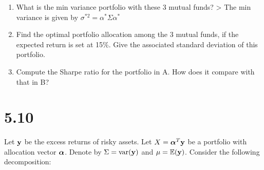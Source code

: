 \documentclass[11pt,]{article}
\newenvironment{Shaded}{\begin{snugshade}}{\end{snugshade}}
\newcommand{\CommentTok}[1]{\textcolor[rgb]{0.56,0.35,0.01}{\textit{#1}}}
\newcommand{\DataTypeTok}[1]{\textcolor[rgb]{0.13,0.29,0.53}{#1}}
\newcommand{\DecValTok}[1]{\textcolor[rgb]{0.00,0.00,0.81}{#1}}
\newcommand{\FloatTok}[1]{\textcolor[rgb]{0.00,0.00,0.81}{#1}}
\newcommand{\KeywordTok}[1]{\textcolor[rgb]{0.13,0.29,0.53}{\textbf{#1}}}
\newcommand{\NormalTok}[1]{#1}
\newcommand{\OperatorTok}[1]{\textcolor[rgb]{0.81,0.36,0.00}{\textbf{#1}}}
\newcommand{\StringTok}[1]{\textcolor[rgb]{0.31,0.60,0.02}{#1}}
\begin{document}
\begin{Shaded}
\end{Shaded}

\begin{enumerate}
\def\labelenumi{\arabic{enumi}.}
\item
  What is the min variance portfolio with these 3 mutual funds?
  \textgreater{} The min variance is given by
  \(\sigma^{*2} = \alpha^* \Sigma \alpha^*\)
\item
  Find the optimal portfolio allocation among the 3 mutual funds, if the
  expected return is set at 15\%. Give the associated standard deviation
  of this portfolio.
\item
  Compute the Sharpe ratio for the portfolio in A. How does it compare
  with that in B?
\end{enumerate}

\hypertarget{section-2}{%
\section{5.10}\label{section-2}}

Let \({\bm{\mathbf{\MakeLowercase{Y}}}}\) be the excess returns of risky
assets. Let
\(X = {\bm{\mathbf{\MakeLowercase{\alpha}}}}^T{\bm{\mathbf{\MakeLowercase{Y}}}}\)
be a portfolio with allocation vector
\({\bm{\mathbf{\MakeLowercase{\alpha}}}}\). Denote by
\(\Sigma = \text{var}({\bm{\mathbf{\MakeLowercase{Y}}}})\) and
\(\mu = \mathbb{E}({\bm{\mathbf{\MakeLowercase{Y}}}})\). Consider the
following decomposition:
\end{document}
